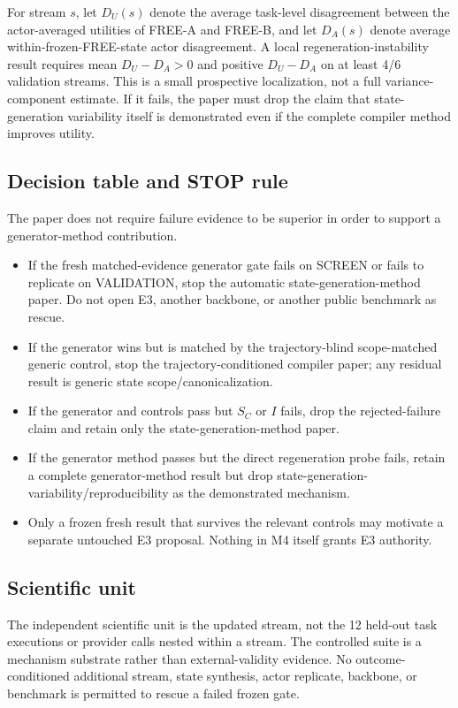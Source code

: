 For stream $s$, let $D_U(s)$ denote the average task-level disagreement between the actor-averaged utilities of FREE-A and FREE-B, and let $D_A(s)$ denote average within-frozen-FREE-state actor disagreement. A local regeneration-instability result requires mean $D_U-D_A>0$ and positive $D_U-D_A$ on at least 4/6 validation streams. This is a small prospective localization, not a full variance-component estimate. If it fails, the paper must drop the claim that state-generation variability itself is demonstrated even if the complete compiler method improves utility.

\subsection{Decision table and STOP rule}
The paper does not require failure evidence to be superior in order to support a generator-method contribution.
\begin{itemize}
    \item If the fresh matched-evidence generator gate fails on SCREEN or fails to replicate on VALIDATION, stop the automatic state-generation-method paper. Do not open E3, another backbone, or another public benchmark as rescue.
    \item If the generator wins but is matched by the trajectory-blind scope-matched generic control, stop the trajectory-conditioned compiler paper; any residual result is generic state scope/canonicalization.
    \item If the generator and controls pass but $S_C$ or $I$ fails, drop the rejected-failure claim and retain only the state-generation-method paper.
    \item If the generator method passes but the direct regeneration probe fails, retain a complete generator-method result but drop state-generation-variability/reproducibility as the demonstrated mechanism.
    \item Only a frozen fresh result that survives the relevant controls may motivate a separate untouched E3 proposal. Nothing in M4 itself grants E3 authority.
\end{itemize}

\subsection{Scientific unit}
The independent scientific unit is the updated stream, not the 12 held-out task executions or provider calls nested within a stream. The controlled suite is a mechanism substrate rather than external-validity evidence. No outcome-conditioned additional stream, state synthesis, actor replicate, backbone, or benchmark is permitted to rescue a failed frozen gate.
